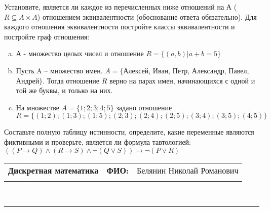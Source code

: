 \documentclass[10pt]{exam}
\newcommand{\class}{Дискретная математика}
\newcommand{\examdate}{}
\begin{document}
\begin{questions}
\question
Установите, является ли каждое из перечисленных ниже отношений на А ($R \subseteq A \times A$) отношением эквивалентности (обоснование ответа обязательно). Для каждого отношения эквивалентности постройте классы 
эквивалентности и постройте граф отношения:
\begin{enumerate} [a)]\setcounter{enumi}{0}
\item А - множество целых чисел и отношение $R = \{(a,b)|a + b = 5\}$
\item Пусть A – множество имен. $A = \{ $Алексей, Иван, Петр, Александр, Павел, Андрей$ \}$. Тогда отношение $R $ верно на парах имен, начинающихся с одной и той же буквы, и только на них.
\item На множестве $A = \{1; 2; 3; 4; 5\}$ задано отношение $R = \{(1; 2); (1; 3); (1; 5); (2; 3); (2; 4); (2; 5); (3; 4); (3; 5); (4; 5)\}$
\end{enumerate}\question Составьте полную таблицу истинности, определите, какие переменные являются фиктивными и проверьте, является ли формула тавтологией:
$((P \rightarrow Q) \land (R \rightarrow S) \land \neg (Q \lor S)) \rightarrow \neg (P \lor R)$

\end{questions}
\newpage
\begin{flushright}
\begin{tabular}{p{2.8in} r l}
\textbf{\class} & \textbf{ФИО:} &Белянин Николай Романович
\\

\textbf{\examdate} &&\\
\end{tabular}\\
\end{flushright}
\rule[1ex]{\textwidth}{.1pt}
\end{document}
